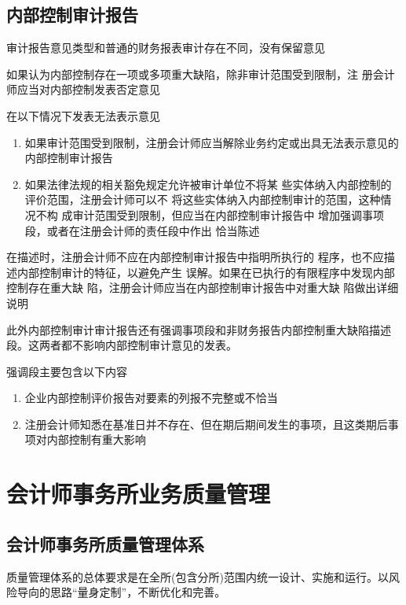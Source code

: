 \documentclass[UTF8,12pt]{ctexart}
\numberwithin{equation}{section} %
\numberwithin{figure}{section}
\numberwithin{table}{section}
\begin{document}
	\subsection{内部控制审计报告}
	审计报告意见类型和普通的财务报表审计存在不同，没有保留意见
	
	如果认为内部控制存在一项或多项重大缺陷，除非审计范围受到限制，注 册会计师应当对内部控制发表否定意见
	
	在以下情况下发表无法表示意见
	\begin{enumerate}
		\item 如果审计范围受到限制，注册会计师应当解除业务约定或出具无法表示意见的内部控制审计报告
		
		\item 如果法律法规的相关豁免规定允许被审计单位不将某 些实体纳入内部控制的评价范围，注册会计师可以不 将这些实体纳入内部控制审计的范围，这种情况不构 成审计范围受到限制，但应当在内部控制审计报告中 增加强调事项段，或者在注册会计师的责任段中作出 恰当陈述
	\end{enumerate}

	在描述时，注册会计师不应在内部控制审计报告中指明所执行的 程序，也不应描述内部控制审计的特征，以避免产生 误解。如果在已执行的有限程序中发现内部控制存在重大缺 陷，注册会计师应当在内部控制审计报告中对重大缺 陷做出详细说明
	
	此外内部控制审计审计报告还有强调事项段和非财务报告内部控制重大缺陷描述段。这两者都不影响内部控制审计意见的发表。
	
	强调段主要包含以下内容
	\begin{enumerate}
		\item 企业内部控制评价报告对要素的列报不完整或不恰当
		
		\item 注册会计师知悉在基准日并不存在、但在期后期间发生的事项，且这类期后事项对内部控制有重大影响
	\end{enumerate}
	
	\newpage
	\section{会计师事务所业务质量管理}
	
	\subsection{会计师事务所质量管理体系}
	质量管理体系的总体要求是在全所(包含分所)范围内统一设计、实施和运行。以风险导向的思路“量身定制”，不断优化和完善。
	
\end{document}
